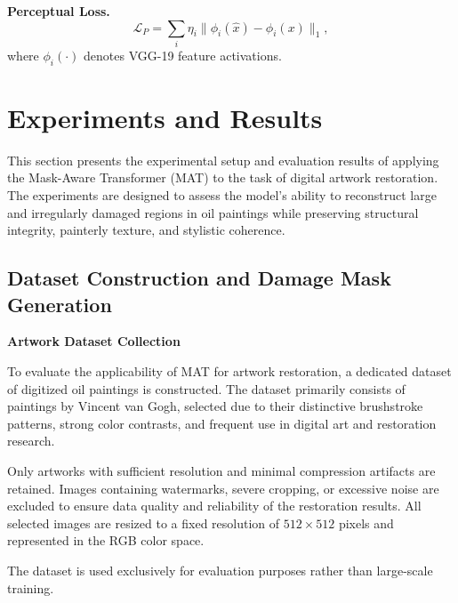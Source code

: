 \documentclass[12pt, twoside]{report}
\begin{document}
\textbf{Perceptual Loss.}
\begin{equation}
\mathcal{L}_P =
\sum_i \eta_i \|\phi_i(\hat{x}) - \phi_i(x)\|_1,
\end{equation}
where $\phi_i(\cdot)$ denotes VGG-19 feature activations.


\section{Experiments and Results}
\label{sec:experiments_results}

This section presents the experimental setup and evaluation results of applying the
Mask-Aware Transformer (MAT) to the task of digital artwork restoration. The experiments
are designed to assess the model's ability to reconstruct large and irregularly damaged
regions in oil paintings while preserving structural integrity, painterly texture, and
stylistic coherence.


\subsection{Dataset Construction and Damage Mask Generation}
\label{sec:dataset_mask_generation}

\noindent\textbf{Artwork Dataset Collection}

To evaluate the applicability of MAT for artwork restoration, a dedicated dataset of
digitized oil paintings is constructed. The dataset primarily consists of paintings by
Vincent van Gogh, selected due to their distinctive brushstroke patterns, strong color
contrasts, and frequent use in digital art and restoration research.

Only artworks with sufficient resolution and minimal compression artifacts are retained.
Images containing watermarks, severe cropping, or excessive noise are excluded to ensure
data quality and reliability of the restoration results. All selected images are resized
to a fixed resolution of $512 \times 512$ pixels and represented in the RGB color space.

The dataset is used exclusively for evaluation purposes rather than large-scale training.
\end{document}

